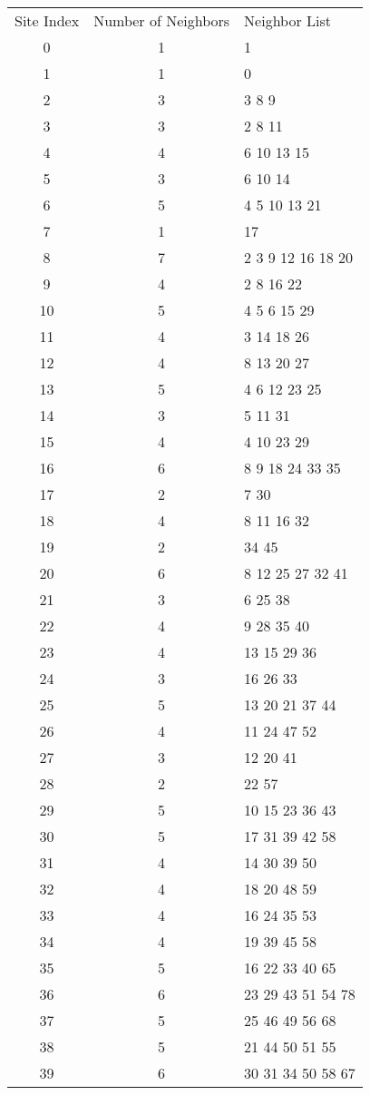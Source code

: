 \documentclass{standalone}
\begin{document}
\begin{tabular}{c c l}Site Index & Number of Neighbors & Neighbor List \\
0 & 1 & 1 \\
1 & 1 & 0 \\
2 & 3 & 3 8 9 \\
3 & 3 & 2 8 11 \\
4 & 4 & 6 10 13 15 \\
5 & 3 & 6 10 14 \\
6 & 5 & 4 5 10 13 21 \\
7 & 1 & 17 \\
8 & 7 & 2 3 9 12 16 18 20 \\
9 & 4 & 2 8 16 22 \\
10 & 5 & 4 5 6 15 29 \\
11 & 4 & 3 14 18 26 \\
12 & 4 & 8 13 20 27 \\
13 & 5 & 4 6 12 23 25 \\
14 & 3 & 5 11 31 \\
15 & 4 & 4 10 23 29 \\
16 & 6 & 8 9 18 24 33 35 \\
17 & 2 & 7 30 \\
18 & 4 & 8 11 16 32 \\
19 & 2 & 34 45 \\
20 & 6 & 8 12 25 27 32 41 \\
21 & 3 & 6 25 38 \\
22 & 4 & 9 28 35 40 \\
23 & 4 & 13 15 29 36 \\
24 & 3 & 16 26 33 \\
25 & 5 & 13 20 21 37 44 \\
26 & 4 & 11 24 47 52 \\
27 & 3 & 12 20 41 \\
28 & 2 & 22 57 \\
29 & 5 & 10 15 23 36 43 \\
30 & 5 & 17 31 39 42 58 \\
31 & 4 & 14 30 39 50 \\
32 & 4 & 18 20 48 59 \\
33 & 4 & 16 24 35 53 \\
34 & 4 & 19 39 45 58 \\
35 & 5 & 16 22 33 40 65 \\
36 & 6 & 23 29 43 51 54 78 \\
37 & 5 & 25 46 49 56 68 \\
38 & 5 & 21 44 50 51 55 \\
39 & 6 & 30 31 34 50 58 67 \\

\end{tabular}
\end{document}
